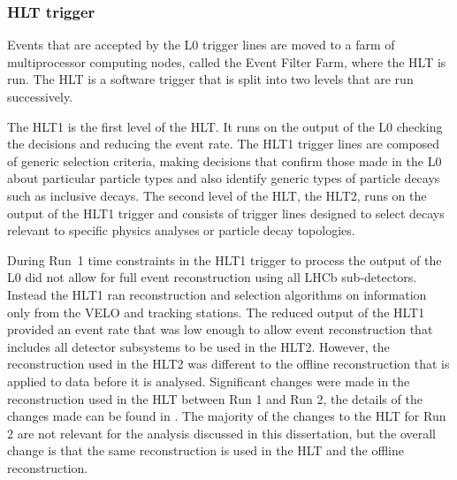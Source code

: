 \subsubsection{HLT trigger}
\label{HLT}

Events that are accepted by the L0 trigger lines are moved to a farm of multiprocessor computing nodes, called the Event Filter Farm, where the HLT is run. The HLT is a software trigger that is split into two levels that are run successively. 

The HLT1 is the first level of the HLT. It runs on the output of the L0 checking the decisions and reducing the event rate. %
The HLT1 trigger lines are composed of generic selection criteria, making decisions that confirm those made in the L0 about particular particle types and also identify generic types of particle decays such as inclusive \bhadron decays. 
The second level of the HLT, the HLT2, runs on the output of the HLT1 trigger and consists of trigger lines designed to select decays relevant to specific physics analyses or particle decay topologies.




During Run~1 time constraints in the HLT1 trigger to process the output of the L0 did not allow for full event reconstruction using all LHCb sub-detectors. Instead the HLT1 ran reconstruction and selection algorithms on information only from the VELO and tracking stations. The reduced output of the HLT1 provided an event rate that was low enough to allow event reconstruction that includes all detector subsystems to be used in the HLT2. However, the reconstruction used in the HLT2 was different to the offline reconstruction that is applied to data before it is analysed. Significant changes were made in the reconstruction used in the HLT between Run 1 and Run 2, the details of the changes made can be found in \cite{Lupton:2230910}. The majority of the changes to the HLT for Run 2 are not relevant for the analysis discussed in this dissertation, but the overall change is that the same reconstruction is used in the HLT and the offline reconstruction. 


